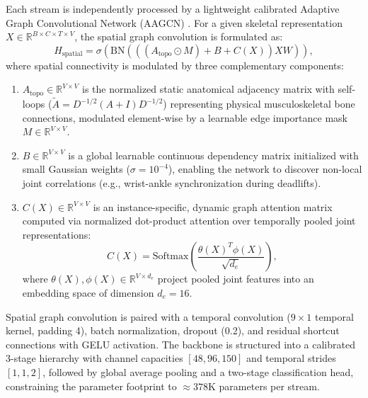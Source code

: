 \documentclass[runningheads]{llncs}
\begin{document}
Each stream is independently processed by a lightweight calibrated Adaptive Graph Convolutional Network (AAGCN) \cite{shi2020skeleton}. For a given skeletal representation $X \in \mathbb{R}^{B \times C \times T \times V}$, the spatial graph convolution is formulated as:
\begin{equation}
    H_{\text{spatial}} = \sigma\left( \mathrm{BN}\left( \left( (A_{\text{topo}} \odot M) + B + C(X) \right) X W \right) \right),
\end{equation}
where spatial connectivity is modulated by three complementary components:
\begin{enumerate}
    \item $A_{\text{topo}} \in \mathbb{R}^{V \times V}$ is the normalized static anatomical adjacency matrix with self-loops ($\tilde{A} = D^{-1/2}(A + I)D^{-1/2}$) representing physical musculoskeletal bone connections, modulated element-wise by a learnable edge importance mask $M \in \mathbb{R}^{V \times V}$.
    \item $B \in \mathbb{R}^{V \times V}$ is a global learnable continuous dependency matrix initialized with small Gaussian weights ($\sigma = 10^{-4}$), enabling the network to discover non-local joint correlations (e.g., wrist-ankle synchronization during deadlifts).
    \item $C(X) \in \mathbb{R}^{V \times V}$ is an instance-specific, dynamic graph attention matrix computed via normalized dot-product attention over temporally pooled joint representations:
    \begin{equation}
        C(X) = \mathrm{Softmax}\left( \frac{\theta(X)^T \phi(X)}{\sqrt{d_e}} \right),
    \end{equation}
    where $\theta(X), \phi(X) \in \mathbb{R}^{V \times d_e}$ project pooled joint features into an embedding space of dimension $d_e = 16$.
\end{enumerate}
Spatial graph convolution is paired with a temporal convolution ($9 \times 1$ temporal kernel, padding 4), batch normalization, dropout (0.2), and residual shortcut connections with GELU activation. The backbone is structured into a calibrated 3-stage hierarchy with channel capacities $[48, 96, 150]$ and temporal strides $[1, 1, 2]$, followed by global average pooling and a two-stage classification head, constraining the parameter footprint to $\approx 378\text{K}$ parameters per stream.
\end{document}
